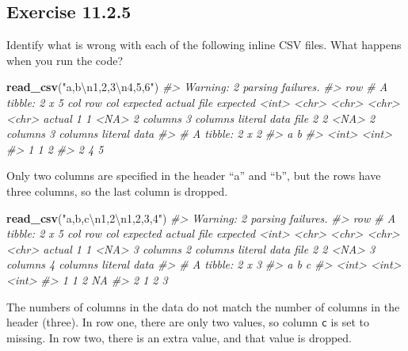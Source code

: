 \documentclass[]{book}
\newenvironment{Shaded}{\begin{snugshade}}{\end{snugshade}}
\newcommand{\CharTok}[1]{\textcolor[rgb]{0.31,0.60,0.02}{#1}}
\newcommand{\CommentTok}[1]{\textcolor[rgb]{0.56,0.35,0.01}{\textit{#1}}}
\newcommand{\KeywordTok}[1]{\textcolor[rgb]{0.13,0.29,0.53}{\textbf{#1}}}
\newcommand{\NormalTok}[1]{#1}
\newcommand{\StringTok}[1]{\textcolor[rgb]{0.31,0.60,0.02}{#1}}
\theoremstyle{plain}
\theoremstyle{remark}
\theoremstyle{definition}
\theoremstyle{definition}
\theoremstyle{definition}
\theoremstyle{remark}
\begin{document}
\hypertarget{exercise-11.2.5}{%
\subsection*{\texorpdfstring{Exercise
{11.2.5}}{Exercise 11.2.5}}\label{exercise-11.2.5}}

Identify what is wrong with each of the following inline CSV files. What
happens when you run the code?

\begin{Shaded}
\begin{Highlighting}[]
\KeywordTok{read_csv}\NormalTok{(}\StringTok{"a,b}\CharTok{\textbackslash{}n}\StringTok{1,2,3}\CharTok{\textbackslash{}n}\StringTok{4,5,6"}\NormalTok{)}
\CommentTok{#> Warning: 2 parsing failures.}
\CommentTok{#> row # A tibble: 2 x 5 col     row col   expected  actual    file         expected   <int> <chr> <chr>     <chr>     <chr>        actual 1     1 <NA>  2 columns 3 columns literal data file 2     2 <NA>  2 columns 3 columns literal data}
\CommentTok{#> # A tibble: 2 x 2}
\CommentTok{#>       a     b}
\CommentTok{#>   <int> <int>}
\CommentTok{#> 1     1     2}
\CommentTok{#> 2     4     5}
\end{Highlighting}
\end{Shaded}

Only two columns are specified in the header ``a'' and ``b'', but the
rows have three columns, so the last column is dropped.

\begin{Shaded}
\begin{Highlighting}[]
\KeywordTok{read_csv}\NormalTok{(}\StringTok{"a,b,c}\CharTok{\textbackslash{}n}\StringTok{1,2}\CharTok{\textbackslash{}n}\StringTok{1,2,3,4"}\NormalTok{)}
\CommentTok{#> Warning: 2 parsing failures.}
\CommentTok{#> row # A tibble: 2 x 5 col     row col   expected  actual    file         expected   <int> <chr> <chr>     <chr>     <chr>        actual 1     1 <NA>  3 columns 2 columns literal data file 2     2 <NA>  3 columns 4 columns literal data}
\CommentTok{#> # A tibble: 2 x 3}
\CommentTok{#>       a     b     c}
\CommentTok{#>   <int> <int> <int>}
\CommentTok{#> 1     1     2    NA}
\CommentTok{#> 2     1     2     3}
\end{Highlighting}
\end{Shaded}

The numbers of columns in the data do not match the number of columns in
the header (three). In row one, there are only two values, so column
\texttt{c} is set to missing. In row two, there is an extra value, and
that value is dropped.
\end{document}
